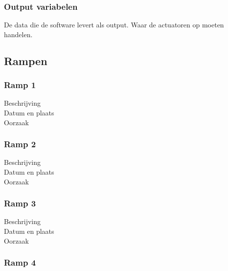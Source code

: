 \documentclass{article}%
\begin{document}
\subsubsection{Output variabelen}
De data die de software levert als output. Waar de actuatoren op moeten handelen.
\subsection{Rampen}

\subsubsection{Ramp 1}
\begin{description}
\item[Beschrijving]
\item[Datum en plaats] 
\item[Oorzaak]
\end{description}

\subsubsection{Ramp 2}
\begin{description}
\item[Beschrijving]
\item[Datum en plaats] 
\item[Oorzaak]
\end{description}

\subsubsection{Ramp 3}
\begin{description}
\item[Beschrijving]
\item[Datum en plaats] 
\item[Oorzaak]
\end{description}

\subsubsection{Ramp 4}
\end{document}
